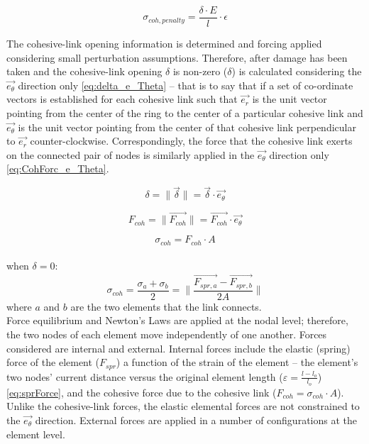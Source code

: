 \documentclass[12pt,a4paper]{article}
\begin{document}
\begin{equation}
\sigma_{coh, penalty} = \frac{\delta \cdot E }{l} \cdot \epsilon
\label{eq:penStress}
\end{equation}

The cohesive-link opening information is determined and forcing applied considering small perturbation assumptions. Therefore, after damage has been taken and the cohesive-link opening $\delta$ is non-zero ($\delta$) is calculated considering the $\vec{e_{\theta}}$ direction only \eqref{eq:delta_e_Theta} -- that is to say that if a set of co-ordinate vectors is established for each cohesive link such that $\vec{e_{r}}$ is the unit vector pointing from the center of the ring to the center of a particular cohesive link and $\vec{e_{\theta}}$ is the unit vector pointing from the center of that cohesive link perpendicular to $\vec{e_{r}}$ counter-clockwise. Correspondingly, the force that the cohesive link exerts on the connected pair of nodes is similarly applied in the $\vec{e_{\theta}}$ direction only \eqref{eq:CohForc_e_Theta}.

\begin{equation}
\delta = \|\vec{\delta}\| = \vec{\delta} \cdot \vec{e_{\theta}}
\label{eq:delta_e_Theta}
\end{equation}

\begin{equation}
F_{coh} = \|\vec{F_{coh}}\| = \vec{F_{coh}} \cdot \vec{e_{\theta}}
\label{eq:CohForc_e_Theta}
\end{equation}

\begin{equation}
\sigma_{coh} = F_{coh} \cdot A
\label{eq:CohForcStress}
\end{equation}\\

when $\delta = 0$:
\begin{equation}
\sigma_{coh} = \frac{\sigma_{a} + \sigma_{b}}{2} = \Big\|\frac{\vec{F_{spr,a}}-\vec{F_{spr,b}}}{2A}\Big\|
\label{eq:CohElasStress}
\end{equation}
where $a$ and $b$ are the two elements that the link connects.\\



Force equilibrium and Newton's Laws are applied at the nodal level; therefore, the two nodes of each element move independently of one another. Forces considered are internal and external. Internal forces include the elastic (spring) force of the element ($F_{spr}$) a function of the strain of the element -- the element's two nodes' current distance versus the original element length ($\varepsilon = \frac{l-l_{o}}{l_{o}}$) \eqref{eq:sprForce}, and the cohesive force due to the cohesive link ($F_{coh} = \sigma_{coh} \cdot A$). Unlike the cohesive-link forces, the elastic elemental forces are not constrained to the $\vec{e_{\theta}}$ direction. External forces are applied in a number of configurations at the element level.
\end{document}
